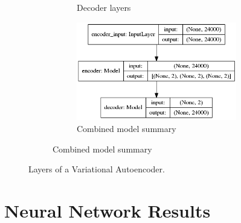 \documentclass[a4paper]{article}
\begin{document}
\begin{figure}[h!]
\begin{subfigure}{.49\textwidth}
\begin{subfigure}{.6\textwidth}
			\caption{Decoder layers}
			\label{fig:vae_decoder}
		\end{subfigure}
		\vspace{10mm}%
		\begin{subfigure}{.8\textwidth}
			\centering
			\includegraphics[width=1\linewidth]{vae_mlp}
			\caption{Combined model summary}
			\label{fig:vae_mlp}
		\end{subfigure}
		\label{fig:decoder}
	\end{subfigure}
	
	\caption{Layers of a Variational Autoencoder.}
	\label{fig:vae}
\end{figure} 


\section{Neural Network Results} \label{results}




\end{document}

